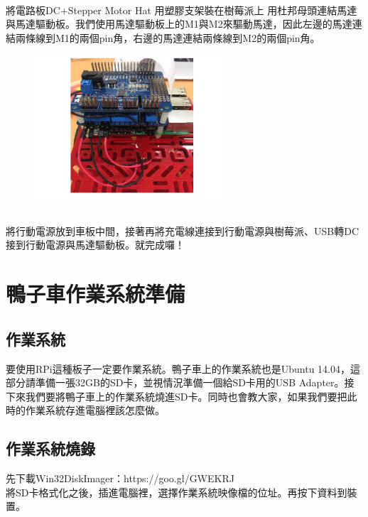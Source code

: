 \documentclass{article}
\begin{document}
\\
將電路板DC+Stepper Motor Hat 用塑膠支架裝在樹莓派上
用杜邦母頭連結馬達與馬達驅動板。我們使用馬達驅動板上的M1與M2來驅動馬達，因此左邊的馬達連結兩條線到M1的兩個pin角，右邊的馬達連結兩條線到M2的兩個pin角。
\\
\begin{figure}[htp]
    \begin{center}
        \includegraphics[width=200pt]{pic/1_1_21.png}
    \end{center}
\end{figure}
\\
將行動電源放到車板中間，接著再將充電線連接到行動電源與樹莓派、USB轉DC接到行動電源與馬達驅動板。就完成囉！

\newpage
\section{鴨子車作業系統準備}
\subsection{作業系統}
要使用RPi這種板子一定要作業系統。鴨子車上的作業系統也是Ubuntu 14.04，這部分請準備一張32GB的SD卡，並視情況準備一個給SD卡用的USB Adapter。接下來我們要將鴨子車上的作業系統燒進SD卡。同時也會教大家，如果我們要把此時的作業系統存進電腦裡該怎麼做。

\subsection{作業系統燒錄}
先下載Win32DiskImager：https://goo.gl/GWEKRJ
\\將SD卡格式化之後，插進電腦裡，選擇作業系統映像檔的位址。再按下資料到裝置。
\end{document}
